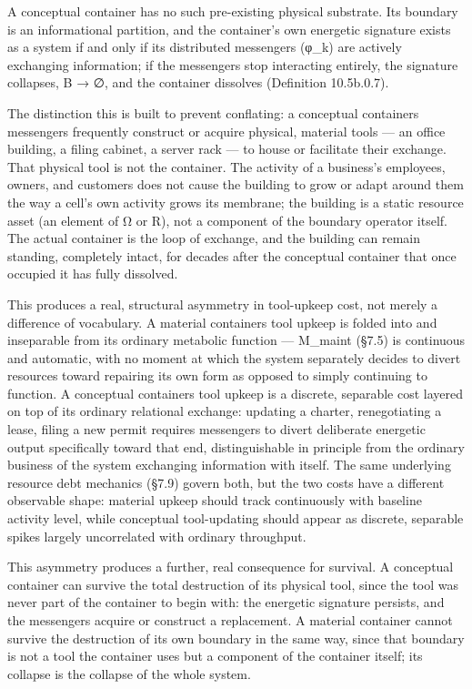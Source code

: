 \documentclass[
]{article}
\begin{document}
A conceptual container has no such pre-existing physical substrate. Its
boundary is an informational partition, and the container's own
energetic signature exists as a system if and only if its distributed
messengers (φ\_k) are actively exchanging information; if the messengers
stop interacting entirely, the signature collapses, B → ∅, and the
container dissolves (Definition 10.5b.0.7).

The distinction this is built to prevent conflating: a conceptual
containers messengers frequently construct or acquire physical, material
tools --- an office building, a filing cabinet, a server rack --- to
house or facilitate their exchange. That physical tool is not the
container. The activity of a business's employees, owners, and customers
does not cause the building to grow or adapt around them the way a
cell's own activity grows its membrane; the building is a static
resource asset (an element of Ω or R), not a component of the boundary
operator itself. The actual container is the loop of exchange, and the
building can remain standing, completely intact, for decades after the
conceptual container that once occupied it has fully dissolved.

This produces a real, structural asymmetry in tool-upkeep cost, not
merely a difference of vocabulary. A material containers tool upkeep is
folded into and inseparable from its ordinary metabolic function ---
M\_maint (§7.5) is continuous and automatic, with no moment at which the
system separately decides to divert resources toward repairing its own
form as opposed to simply continuing to function. A conceptual
containers tool upkeep is a discrete, separable cost layered on top of
its ordinary relational exchange: updating a charter, renegotiating a
lease, filing a new permit requires messengers to divert deliberate
energetic output specifically toward that end, distinguishable in
principle from the ordinary business of the system exchanging
information with itself. The same underlying resource debt mechanics
(§7.9) govern both, but the two costs have a different observable shape:
material upkeep should track continuously with baseline activity level,
while conceptual tool-updating should appear as discrete, separable
spikes largely uncorrelated with ordinary throughput.

This asymmetry produces a further, real consequence for survival. A
conceptual container can survive the total destruction of its physical
tool, since the tool was never part of the container to begin with: the
energetic signature persists, and the messengers acquire or construct a
replacement. A material container cannot survive the destruction of its
own boundary in the same way, since that boundary is not a tool the
container uses but a component of the container itself; its collapse is
the collapse of the whole system.
\end{document}
